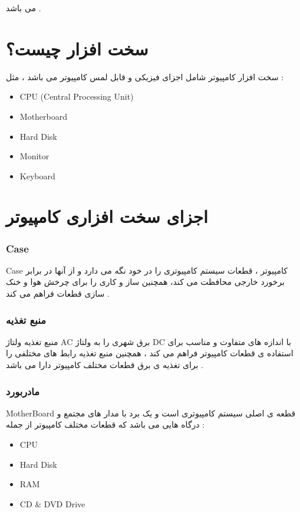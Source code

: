 \documentclass[12pt]{book}
\begin{document}
می باشد .

\section{سخت افزار چیست؟}

سخت افزار کامپیوتر شامل اجزای فیزیکی و قابل لمس کامپیوتر می باشد ، مثل :

\begin{latin}
\begin{itemize}
	\item CPU (Central Processing Unit)
	\item Motherboard
	\item Hard Disk
	\item Monitor
	\item Keyboard
\end{itemize}
\end{latin}

\section{اجزای سخت افزاری کامپیوتر}

\subsubsection{Case}

Case
کامپیوتر ، قطعات سیستم کامپیوتری را در خود نگه می دارد و از آنها در برابر برخورد خارجی محافظت می کند، همچنین ساز و کاری را برای چرخش هوا و خنک سازی قطعات فراهم می کند .

\subsubsection{منبع تغذیه }

منبع تغذیه ولتاژ AC برق شهری را به ولتاژ  DC با اندازه های متفاوت و مناسب برای استفاده ی قطعات کامپیوتر فراهم می کند ، همچنین منبع تغذیه رابط های مختلفی را برای تغذیه ی برق قطعات مختلف کامپیوتر دارا می باشد .

\subsubsection{ مادربورد }

MotherBoard
قطعه ی اصلی سیستم کامپیوتری است و یک برد با مدار های مجتمع و درگاه هایی می باشد که قطعات مختلف کامپیوتر از جمله :

\begin{latin}
\begin{itemize}
	\item CPU
	\item Hard Disk
	\item RAM
	\item CD \& DVD Drive
\end{itemize}
\end{latin}
\end{document}
